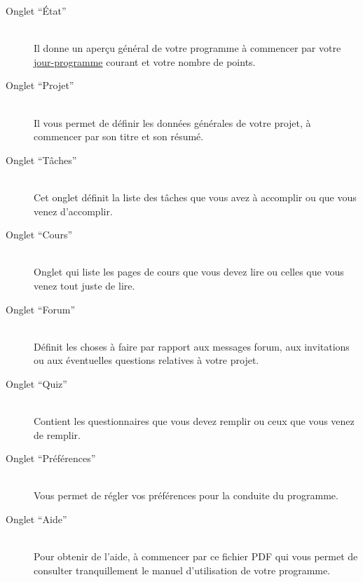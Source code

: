 \begin{description}
\item[Onglet ``État''] \hfill \\
 Il donne un aperçu général de votre programme à commencer par votre \hyperlink{explicationjourprogrammejourreel}{jour-programme} courant et votre nombre de points.



\item[Onglet ``Projet''] \hfill \\
 Il vous permet de définir les données générales de votre projet, à commencer par son titre et son résumé.



\item[Onglet ``Tâches''] \hfill \\
 Cet onglet définit la liste des tâches que vous avez à accomplir ou que vous venez d'accomplir.



\item[Onglet ``Cours''] \hfill \\
 Onglet qui liste les pages de cours que vous devez lire ou celles que vous venez tout juste de lire.



\item[Onglet ``Forum''] \hfill \\
 Définit les choses à faire par rapport aux messages forum, aux invitations ou aux éventuelles questions relatives à votre projet.



\item[Onglet ``Quiz''] \hfill \\
 Contient les questionnaires que vous devez remplir ou ceux que vous venez de remplir.



\item[Onglet ``Préférences''] \hfill \\
 Vous permet de régler vos préférences pour la conduite du programme.



\item[Onglet ``Aide''] \hfill \\
 Pour obtenir de l'aide, à commencer par ce fichier PDF qui vous permet de consulter tranquillement le manuel d'utilisation de votre programme.
\end{description}

